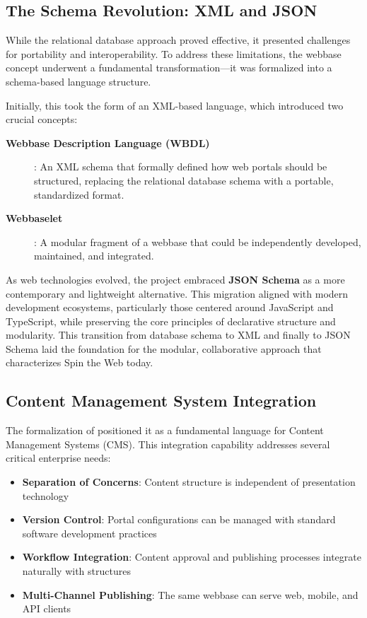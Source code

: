 \subsection{The Schema Revolution: XML and JSON}

While the relational database approach proved effective, it presented challenges for portability and interoperability. To address these limitations, the webbase concept underwent a fundamental transformation—it was formalized into a schema-based language structure.

Initially, this took the form of an XML-based language, which introduced two crucial concepts:

\begin{description}
\item[\textbf{Webbase Description Language (WBDL)}]: An XML schema that formally defined how web portals should be structured, replacing the relational database schema with a portable, standardized format.
\item[\textbf{Webbaselet}]: A modular fragment of a webbase that could be independently developed, maintained, and integrated.
\end{description}

As web technologies evolved, the project embraced \textbf{JSON Schema} as a more contemporary and lightweight alternative. This migration aligned \wbdl{} with modern development ecosystems, particularly those centered around JavaScript and TypeScript, while preserving the core principles of declarative structure and modularity. This transition from database schema to XML and finally to JSON Schema laid the foundation for the modular, collaborative approach that characterizes Spin the Web today.

\subsection{Content Management System Integration}

The formalization of \wbdl{} positioned it as a fundamental language for Content Management Systems (CMS). This integration capability addresses several critical enterprise needs:

\begin{itemize}
\item \textbf{Separation of Concerns}: Content structure is independent of presentation technology
\item \textbf{Version Control}: Portal configurations can be managed with standard software development practices
\item \textbf{Workflow Integration}: Content approval and publishing processes integrate naturally with \wbdl{} structures
\item \textbf{Multi-Channel Publishing}: The same webbase can serve web, mobile, and API clients
\end{itemize}

